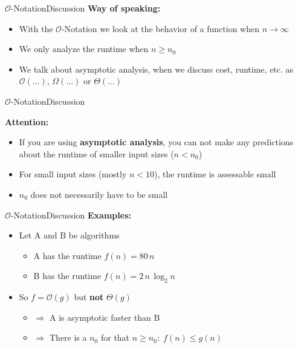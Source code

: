 
\begin{frame}{$\mathcal{O}$-Notation}{Discussion}
  \textbf{Way of speaking:}
  \begin{itemize}
    \item
      With the $\mathcal{O}$-Notation we look at the behavior of a function when
      $n \to \infty$
    \item
      We only analyze the runtime when $n \geq n_0$
    \item
      We talk about {\color{MainA}asymptotic analysis}, when we discuss 
      cost, runtime, etc. as $\mathcal{O}(\ldots)$, $\Omega(\ldots)$
      or $\Theta(\ldots)$
  \end{itemize}
\end{frame}


\begin{frame}{$\mathcal{O}$-Notation}{Discussion}
  \begin{alertblock}{\textbf{Attention:}}
    \begin{itemize}
      \item
        If you are using \textbf{asymptotic analysis}, you can not make any
        predictions about the runtime of smaller input sizes ($n < n_0$)
      \item
        For small input sizes (mostly $n < 10$),
        the runtime is assessable small
      \item
        $n_0$ does not necessarily have to be small
    \end{itemize}
  \end{alertblock}
\end{frame}


\begin{frame}{$\mathcal{O}$-Notation}{Discussion}
  \textbf{Examples:}
  \begin{itemize}
    \item
    Let A and B be algorithms
    \begin{itemize}
      \item
        A has the runtime $f(n) = 80 \, n$
      \item
        B has the runtime $f(n) = 2 \, n \, \log_2 n$
    \end{itemize}
    \item
      So $f = \mathcal{O}(g)$ but \textbf{not} $\Theta(g)$
      \begin{itemize}
        \item
          $\Rightarrow$ A is asymptotic faster than B
        \item
          $\Rightarrow$
          There is a $n_0$ for that $n \geq n_0\!: \; f(n) \leq g(n)$
      \end{itemize}
  \end{itemize}
\end{frame}

